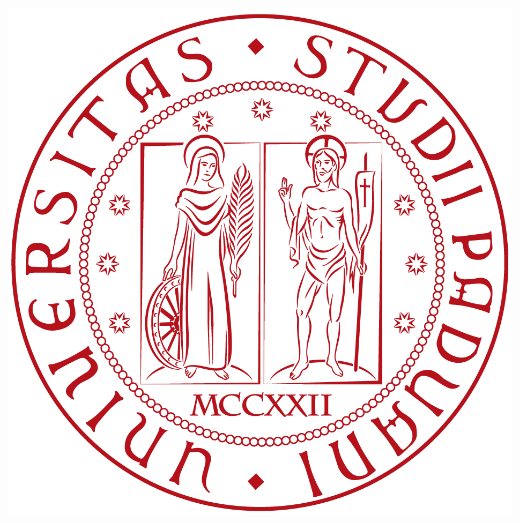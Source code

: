 \begin{titlepage}
    \begin{center}

	\begin{center}
	\includegraphics[scale=0.08]{Graphics/unipd.png}
	\end{center}
	

\end{center}
\end{titlepage}
